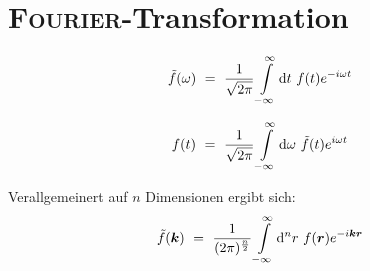 \section{\textsc{Fourier}-Transformation}

\begin{equation*}
\tilde{f}(\omega) \ = \ \frac{1}{\sqrt{2\pi}}\Int{-\infty}{\infty}{t} f(t)e^{-i\omega t}
\end{equation*}

\begin{equation*}
f(t) \ = \ \frac{1}{\sqrt{2\pi}}\Int{-\infty}{\infty}{\omega} \tilde{f}(t)e^{i\omega t}
\end{equation*}

Verallgemeinert auf $n$ Dimensionen ergibt sich:\\

\begin{equation*}
\tilde{f}(\vec{k}) \ = \ \frac{1}{({2\pi})^{\frac{n}{2}}}\Int{-\infty}{\infty}{^n r}f(\vec{r})e^{-i\vec{k}\vec{r}}
\end{equation*}

\ \linebreak


